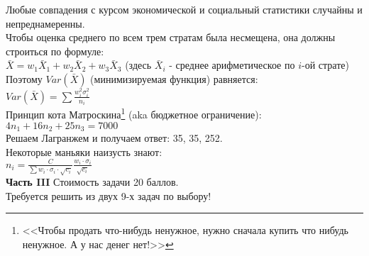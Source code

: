 \documentclass[pdftex,12pt,a4paper]{article}
\begin{document}
Любые совпадения с курсом экономической и социальный статистики случайны и непреднамеренны. \\
Чтобы оценка среднего по всем трем стратам была несмещена, она должны строиться по формуле: \\
$\bar{X}=w_{1}\bar{X}_{1}+w_{2}\bar{X}_{2}+w_{3}\bar{X}_{3}$ (здесь $\bar{X}_{i}$ - среднее арифметическое по $i$-ой страте) \\
Поэтому $Var(\bar{X})$ (минимизируемая функция) равняется: \\
$Var(\bar{X})=\sum \frac{w^{2}_{i}\sigma^{2}_{i}}{n_{i}}$ \\
Принцип кота Матроскина\footnote{<<Чтобы продать что-нибудь ненужное, нужно сначала купить что нибудь ненужное. А у нас денег нет!>>} (aka бюджетное ограничение):  $4n_{1}+16n_{2}+25n_{3}=7000$ \\
Решаем Лагранжем и получаем ответ: 35, 35, 252. \\
Некоторые маньяки наизусть знают: \\
$n_{i}=\frac{C}{\sum w_{i}\cdot \sigma_{i}\cdot\sqrt{c_{i}}}\frac{w_{i}\cdot \sigma_{i}}{\sqrt{c_{i}}}$\\






\textbf{Часть III} Стоимость задачи 20 баллов. \\

Требуется решить \textbf{} из двух 9-х задач по
выбору! \\
\end{document}
